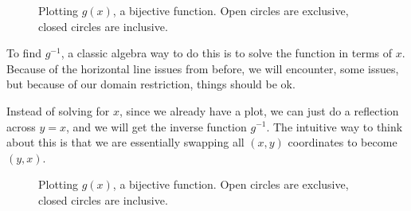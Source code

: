 {\begin{figure}[H]
    \caption{Plotting $g(x)$, a bijective function. Open circles are exclusive, closed circles are inclusive.}
    \label{chap1:sec2:p6:fig:2}
  \end{figure}

  To find $g^{-1}$, a classic algebra way to do this is to solve the function in
  terms of $x$. Because of the horizontal line issues from before, we will
  encounter, some issues, but because of our domain restriction, things should
  be ok.

  Instead of solving for $x$, since we already have a plot, we can just do a
  reflection across $y=x$, and we will get the inverse function $g^{-1}$. The
  intuitive way to think about this is that we are essentially swapping all $(x,
  y)$ coordinates to become $(y, x)$.

  \begin{figure}[H]
    \centering
    \caption{Plotting $g(x)$, a bijective function. Open circles are exclusive, closed circles are inclusive.}
    \label{chap1:sec2:p6:fig:3}
  \end{figure}
}
